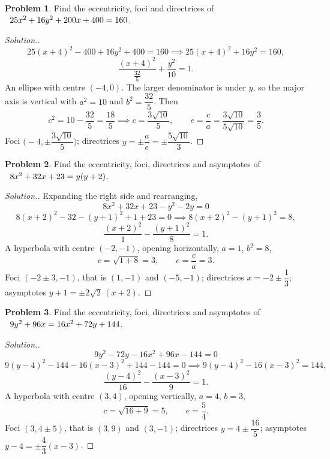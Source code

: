 \documentclass[11pt,a4paper]{article}
\theoremstyle{definition}
\newtheorem{problemx}{Problem}[subsection]
\newenvironment{problem}{\begin{problemx}}{\end{problemx}}
\newenvironment{solution}
  {\renewcommand{\qedsymbol}{}\begin{proof}[\textit{Solution}.]}
  {\end{proof}}
\begin{document}
\begin{problem}
Find the eccentricity, foci and directrices of
$\hspace{0.2cm} 25x^2 + 16y^2 + 200x + 400 = 160$.
\end{problem}
\begin{solution}
$$25(x+4)^2 - 400 + 16y^2 + 400 = 160 \implies 25(x+4)^2 + 16y^2 = 160 ,$$
$$\frac{(x+4)^2}{\frac{32}{5}} + \frac{y^2}{10} = 1 .$$
An ellipse with centre $(-4, 0)$. The larger denominator is under $y$, so the
major axis is vertical with $a^2 = 10$ and $b^2 = \dfrac{32}{5}$. Then
$$c^2 = 10 - \frac{32}{5} = \frac{18}{5}
\implies c = \frac{3\sqrt{10}}{5}, \qquad
e = \frac{c}{a} = \frac{3\sqrt{10}}{5\sqrt{10}} = \frac{3}{5}.$$
Foci $\Big(-4, \pm\dfrac{3\sqrt{10}}{5}\Big)$; directrices
$y = \pm\dfrac{a}{e} = \pm\dfrac{5\sqrt{10}}{3}$.
\end{solution}

\begin{problem}
Find the eccentricity, foci, directrices and asymptotes of
$\hspace{0.2cm} 8x^2 + 32x + 23 = y(y+2)$.
\end{problem}
\begin{solution}
Expanding the right side and rearranging,
$$8x^2 + 32x + 23 - y^2 - 2y = 0$$
$$8(x+2)^2 - 32 - (y+1)^2 + 1 + 23 = 0 \implies 8(x+2)^2 - (y+1)^2 = 8 ,$$
$$\frac{(x+2)^2}{1} - \frac{(y+1)^2}{8} = 1 .$$
A hyperbola with centre $(-2,-1)$, opening horizontally, $a = 1$, $b^2 = 8$,
$$c = \sqrt{1+8} = 3, \qquad e = \frac{c}{a} = 3 .$$
Foci $(-2\pm 3, -1)$, that is $(1,-1)$ and $(-5,-1)$; directrices
$x = -2 \pm \dfrac{1}{3}$; asymptotes
$y + 1 = \pm 2\sqrt2\,(x+2)$.
\end{solution}

\begin{problem}
Find the eccentricity, foci, directrices and asymptotes of
$\hspace{0.2cm} 9y^2 + 96x = 16x^2 + 72y + 144$.
\end{problem}
\begin{solution}
$$9y^2 - 72y - 16x^2 + 96x - 144 = 0$$
$$9(y-4)^2 - 144 - 16(x-3)^2 + 144 - 144 = 0
\implies 9(y-4)^2 - 16(x-3)^2 = 144 ,$$
$$\frac{(y-4)^2}{16} - \frac{(x-3)^2}{9} = 1 .$$
A hyperbola with centre $(3,4)$, opening vertically, $a = 4$, $b = 3$,
$$c = \sqrt{16+9} = 5, \qquad e = \frac{5}{4}.$$
Foci $(3, 4\pm 5)$, that is $(3,9)$ and $(3,-1)$; directrices
$y = 4 \pm \dfrac{16}{5}$; asymptotes $y - 4 = \pm\dfrac{4}{3}(x-3)$.
\end{solution}
\end{document}
